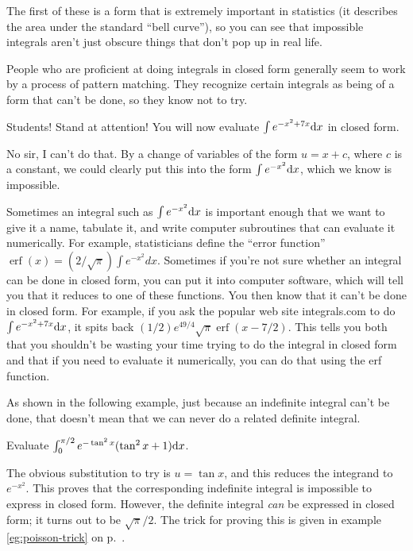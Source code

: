 The first of these is a form that is extremely important in statistics (it describes the area under the
standard ``bell curve''), so you can see that
impossible integrals aren't just obscure things that don't pop up in real life.

People who are proficient at doing integrals in closed form generally seem to work by a process of pattern
matching. They recognize certain integrals as being of a form that can't be done, so they know not to try.

\begin{eg}
\egquestion Students! Stand at attention! You will now evaluate $\int e^{-x^2+7x} \textup{d} x$ in closed form.

\eganswer
No sir, I can't do that. By a change of variables of the form $u=x+c$, where $c$ is a constant,
we could clearly put this into the form $\int e^{-x^2} \textup{d} x$, which we know is impossible.
\end{eg}

Sometimes an integral such as $\int e^{-x^2} \textup{d} x$ is important enough that we want to give it a name,
tabulate it, and write computer subroutines that can evaluate it numerically. For example, statisticians
define the ``error function'' $\operatorname{erf}(x)=(2/\sqrt{\pi}) \int e^{-x^2} dx$. Sometimes if you're not sure whether
an integral can be done in closed form, you can put it into computer software, which will tell you that it
reduces to one of these functions. You then know that it can't be done in closed form. For example, if you ask the
popular web site integrals.com to do $\int e^{-x^2+7x} \textup{d} x$, it spits back $(1/2)e^{49/4}\sqrt{\pi}\operatorname{erf}(x-7/2)$.
This tells you both that you shouldn't be wasting your time trying to do the integral in closed form and that
if you need to evaluate it numerically, you can do that using the erf function.

As shown in the following example, just because an indefinite integral can't be done, that doesn't mean that we can never do
a related definite integral.

\begin{eg}
\egquestion Evaluate $\int_0^{\pi/2} e^{-\tan^2 x}(\tan^2x+1)\textup{d} x$.

\eganswer The obvious substitution to try is $u=\tan x$, and this reduces the integrand to $e^{-x^2}$.
This proves that the corresponding indefinite integral is impossible to express in closed form. However,
the definite integral \emph{can} be expressed in closed form; it turns out to be $\sqrt{\pi}/2$. The trick
for proving this is given in example \ref{eg:poisson-trick} on p.~\pageref{eg:poisson-trick}.
\end{eg}

